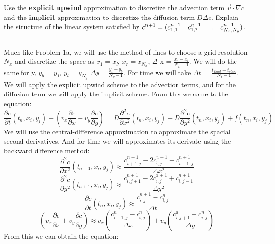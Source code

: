 \documentclass[12pt]{article}
\begin{document}
\noindent Use the \textbf{explicit upwind} approximation to discretize the advection term $\vec{v} \cdot \nabla c$ and the \textbf{implicit} approximation to discretize the diffusion term $D\Delta c$. Explain the structure of the linear system satisfied by $\vec{c}^{n+1} = (c_{1,1}^{n+1}\hspace {.35cm}c_{1,2}^{n+1} \hspace {.35cm}... \hspace{.35cm}c_{N_{x},N_{y}}^{n+1})$.
\begin{center}
\rule{10cm}{0.4pt}
\end{center}
Much like Problem 1a, we will use the method of lines to choose a grid resolution $N_x$ and discretize the space as $x_1 = x_l$, $x_r = x_{N_x}$, $\Delta$ x = $\frac{x_r - x_l}{N_x - 1}$. We will do the same for y, $y_b = y_1$, $y_t = y_{N_y}$ $\Delta y = \frac{y_t - y_b}{N_y - 1}$. For time we will take $\Delta t$ = $\frac{t_{final} - t_{start}}{N_t - 1}$. We will apply the explicit upwind scheme to the advection terms, and for the diffusion term we will apply the implicit scheme. From this we come to the equation:
\begin{equation}
\frac{\partial c}{\partial t}(t_{n}, x_i,y_j) + (v_x\frac{\partial c}{\partial x} + v_y\frac{\partial c}{\partial y})= D \frac{\partial ^2 c}{\partial x^2} (t_{n}, x_i,y_j) + D \frac{\partial ^2 c}{\partial y^2} (t_{n}, x_i,y_j) + f (t_{n}, x_i,y_j)
\end{equation}
We will use the central-difference approximation to approximate the spacial second derivatives. And for time we will approximates its derivate using the backward difference method:
\begin{equation*}
\frac{\partial ^2 c}{\partial x^2} (t_{n+1}, x_i,y_j) \approx \frac{c^{n+1}_{i+1,j} - 2c^{n+1}_{i,j}+c^{n+1}_{i-1,j}}{\Delta x^2}
\end{equation*}
\begin{equation*}
\frac{\partial ^2 c}{\partial y^2} (t_{n+1}, x_i,y_j) \approx \frac{c^{n+1}_{i,j+1} - 2c^{n+1}_{i,j}+c^{n+1}_{i,j-1}}{\Delta y^2}
\end{equation*}
\begin{equation*}
\frac{\partial c}{\partial t} (t_{n}, x_i,y_j) \approx \frac{c_{i,j}^{n+1}-c_{i,j}^n}{\Delta t}
\end{equation*}
\begin{equation*}
(v_x\frac{\partial c}{\partial x} + v_y\frac{\partial c}{\partial y}) \approx v_x(\frac{c^n_{i+1,j} - c^n_{i,j}}{\Delta x}) + v_y(\frac{c^n_{i,j+1} - c^n_{i,j}}{\Delta y})
\end{equation*}
From this we can obtain the equation:
\end{document}
